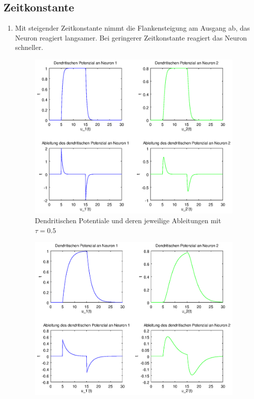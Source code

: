 \documentclass[DIN, pagenumber=false, fontsize=11pt, parskip=half]{scrartcl}
\begin{document}
    \subsection{Zeitkonstante}
    \begin{enumerate}[label=(\alph*)]
        \item Mit steigender Zeitkonstante nimmt die Flankensteigung am Ausgang ab, das Neuron reagiert langsamer.
            Bei geringerer Zeitkonstante reagiert das Neuron schneller. 
            \begin{figure}[H]
                \centering
                \includegraphics[trim = {0 9cm 27cm 0}, clip,width=\textwidth]{Plot_tau05}
                \caption{Dendritischen Potentiale und deren jeweilige Ableitungen mit $\tau=0.5$}
            \end{figure} 
            \begin{figure}[H]
                \centering
                \includegraphics[trim = {0 9cm 27cm 0}, clip,width=\textwidth]{Plot_tau2}

\end{figure}
\end{enumerate}
\end{document}
